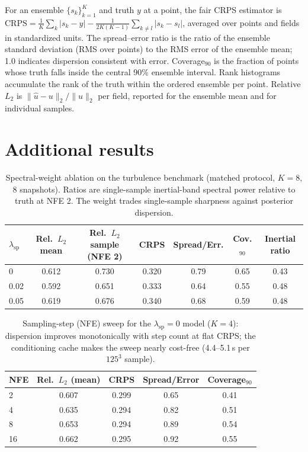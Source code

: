\documentclass{article} %
\begin{document}
For an ensemble $\{s_k\}_{k=1}^{K}$ and truth $y$ at a point, the fair CRPS estimator is
$\mathrm{CRPS}=\frac{1}{K}\sum_k |s_k-y| - \frac{1}{2K(K-1)}\sum_{k\ne l}|s_k-s_l|$,
averaged over points and fields in standardized units. The spread--error ratio is the ratio of the ensemble standard deviation (RMS over points) to the RMS error of the ensemble mean; 1.0 indicates dispersion consistent with error. Coverage$_{90}$ is the fraction of points whose truth falls inside the central 90\% ensemble interval. Rank histograms accumulate the rank of the truth within the ordered ensemble per point. Relative $L_2$ is $\|\hat{u}-u\|_2/\|u\|_2$ per field, reported for the ensemble mean and for individual samples.

\section{Additional results}
\label{app:extra}

\begin{table}[h]
\caption{Spectral-weight ablation on the turbulence benchmark (matched protocol, $K{=}8$, 8 snapshots). Ratios are single-sample inertial-band spectral power relative to truth at NFE 2. The weight trades single-sample sharpness against posterior dispersion.}
\label{tab:spectral}
\begin{center}
\small
\setlength{\tabcolsep}{4pt}
\begin{tabular}{lcccccc}
\toprule
$\lambda_{\mathrm{sp}}$ & Rel.\ $L_2$ mean & Rel.\ $L_2$ sample (NFE 2) & CRPS & Spread/Err. & Cov.$_{90}$ & Inertial ratio \\
\midrule
0 & 0.612 & 0.730 & 0.320 & 0.79 & 0.65 & 0.43 \\
0.02 & 0.592 & 0.651 & 0.333 & 0.64 & 0.55 & 0.48 \\
0.05 & 0.619 & 0.676 & 0.340 & 0.68 & 0.59 & 0.48 \\
\bottomrule
\end{tabular}
\end{center}
\end{table}

\begin{table}[h]
\caption{Sampling-step (NFE) sweep for the $\lambda_{\mathrm{sp}}{=}0$ model ($K{=}4$): dispersion improves monotonically with step count at flat CRPS; the conditioning cache makes the sweep nearly cost-free (4.4--5.1\,s per $125^3$ sample).}
\label{tab:nfe}
\begin{center}
\small
\begin{tabular}{lcccc}
\toprule
NFE & Rel.\ $L_2$ (mean) & CRPS & Spread/Error & Coverage$_{90}$ \\
\midrule
2 & 0.607 & 0.299 & 0.65 & 0.41 \\
4 & 0.635 & 0.294 & 0.82 & 0.51 \\
8 & 0.653 & 0.294 & 0.89 & 0.54 \\
16 & 0.662 & 0.295 & 0.92 & 0.55 \\
\bottomrule
\end{tabular}
\end{center}
\end{table}
\end{document}
